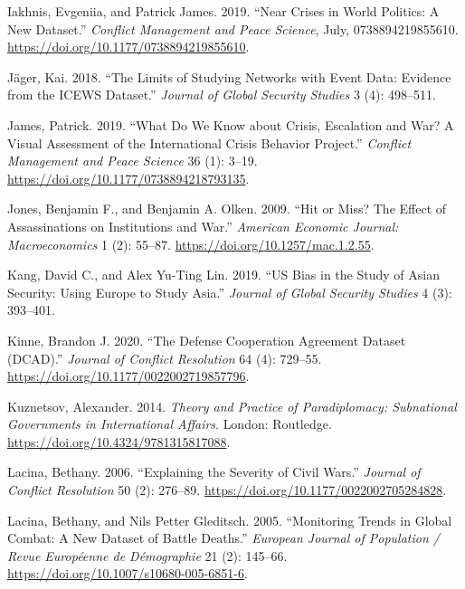 \documentclass{article}
\newlength{\cslhangindent}
\newlength{\cslentryspacingunit} %
\newenvironment{CSLReferences}[2] %
 {%
  \setlength{\parindent}{0pt}
  \ifodd #1
  \let\oldpar\par
  \def\par{\hangindent=\cslhangindent\oldpar}
  \fi
  \setlength{\parskip}{#2\cslentryspacingunit}
 }%
 {}
\begin{document}
\begin{CSLReferences}{1}{0}
\leavevmode{}%
Iakhnis, Evgeniia, and Patrick James. 2019. {``Near Crises in World
Politics: {A} New Dataset.''} \emph{Conflict Management and Peace
Science}, July, 0738894219855610.
\url{https://doi.org/10.1177/0738894219855610}.

\leavevmode{}%
Jäger, Kai. 2018. {``The {Limits} of {Studying Networks} with {Event
Data}: {Evidence} from the {ICEWS Dataset}.''} \emph{Journal of Global
Security Studies} 3 (4): 498--511.

\leavevmode{}%
James, Patrick. 2019. {``What Do We Know about Crisis, Escalation and
War? {A} Visual Assessment of the {International Crisis Behavior
Project}.''} \emph{Conflict Management and Peace Science} 36 (1): 3--19.
\url{https://doi.org/10.1177/0738894218793135}.

\leavevmode{}%
Jones, Benjamin F., and Benjamin A. Olken. 2009. {``Hit or {Miss}? {The
Effect} of {Assassinations} on {Institutions} and {War}.''}
\emph{American Economic Journal: Macroeconomics} 1 (2): 55--87.
\url{https://doi.org/10.1257/mac.1.2.55}.

\leavevmode{}%
Kang, David C., and Alex Yu-Ting Lin. 2019. {``{US} Bias in the Study of
{Asian} Security: {Using Europe} to Study {Asia}.''} \emph{Journal of
Global Security Studies} 4 (3): 393--401.

\leavevmode{}%
Kinne, Brandon J. 2020. {``The {Defense Cooperation Agreement Dataset}
({DCAD}).''} \emph{Journal of Conflict Resolution} 64 (4): 729--55.
\url{https://doi.org/10.1177/0022002719857796}.

\leavevmode{}%
Kuznetsov, Alexander. 2014. \emph{Theory and {Practice} of
{Paradiplomacy}: {Subnational Governments} in {International Affairs}}.
{London}: {Routledge}. \url{https://doi.org/10.4324/9781315817088}.

\leavevmode{}%
Lacina, Bethany. 2006. {``Explaining the {Severity} of {Civil Wars}.''}
\emph{Journal of Conflict Resolution} 50 (2): 276--89.
\url{https://doi.org/10.1177/0022002705284828}.

\leavevmode{}%
Lacina, Bethany, and Nils Petter Gleditsch. 2005. {``Monitoring {Trends}
in {Global Combat}: {A New Dataset} of {Battle Deaths}.''}
\emph{European Journal of Population / Revue Européenne de Démographie}
21 (2): 145--66. \url{https://doi.org/10.1007/s10680-005-6851-6}.


\end{CSLReferences}
\end{document}
